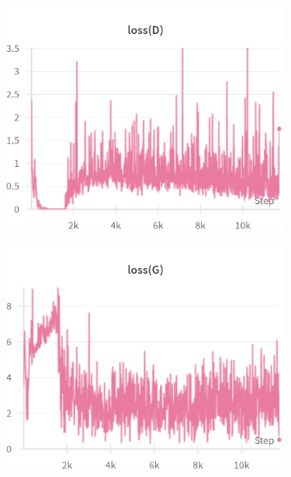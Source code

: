 \begin{figure}[H]
    \centering

    \begin{subfigure}{0.45\textwidth}
        \centering
        \includegraphics[width=0.95\linewidth]{cifar10/64/lossD.png}
        \caption{}
        \label{subfig:cifar10/64/lossD}
    \end{subfigure}%
    \begin{subfigure}{0.45\textwidth}
        \centering
        \includegraphics[width=0.95\linewidth]{cifar10/64/lossG.png}
        \caption{}
        \label{subfig:cifar10/64/lossG}
    \end{subfigure}


\end{figure}
